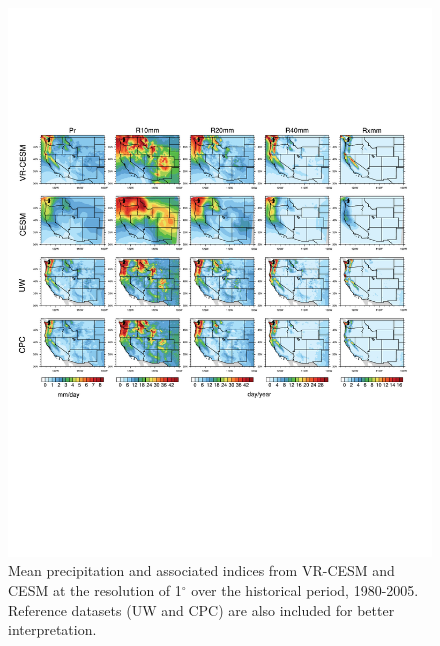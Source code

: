 \documentclass{ametsoc}
\begin{document}
\begin{figure}
\begin{center}
\includegraphics[width=6in]{wd_index_hist_vr_vs_1deg_cesm.pdf}
\caption{Mean precipitation and associated indices from VR-CESM and CESM at the resolution of 1$^\circ$ over the historical period, 1980-2005. Reference datasets (UW and CPC) are also included for better interpretation.}
\end{center}
\label{fig:resEffect}
\end{figure}
\end{document}
